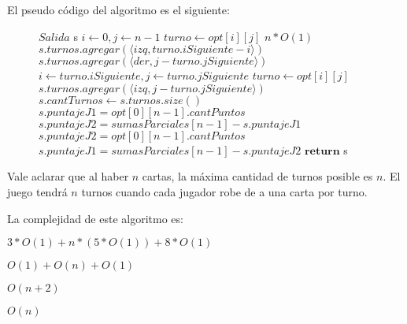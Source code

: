 El pseudo código del algoritmo es el siguiente:

\begin{center}
 \begin{figure}[H]
  \begin{pseudo}
    \State $Salida$  s 
    \State $i \leftarrow 0, j \leftarrow n-1$ 
    \State $turno \leftarrow opt[i][j]$ 
     \hfill $n*O(1)$
       
	\State $s.turnos.agregar(\langle izq, turno.iSiguiente - i \rangle)$ 
      \Else 
	\State $s.turnos.agregar(\langle der, j - turno.jSiguiente \rangle)$ 
      \EndIf
      \State $i \leftarrow turno.iSiguiente, j \leftarrow turno.jSiguiente$ 
      \State $turno \leftarrow opt[i][j]$ 
    \EndWhile
    \State $s.turnos.agregar(\langle izq, j - turno.jSiguiente \rangle)$ 
    \State $s.cantTurnos \leftarrow s.turnos.size()$ 
     
      \State $s.puntajeJ1 = opt[0][n-1].cantPuntos$ 
      \State $s.puntajeJ2 = sumasParciales[n-1] - s.puntajeJ1$ 
    \Else
      \State $s.puntajeJ2 = opt[0][n-1].cantPuntos$ 
      \State $s.puntajeJ1 = sumasParciales[n-1] - s.puntajeJ2$ 
    \EndIf
    \State $\textbf{return}$ s 
   \EndProcedure
  \end{pseudo}

 \end{figure}

\end{center}

Vale aclarar que al haber $n$ cartas, la máxima cantidad de turnos posible es $n$. El juego tendrá $n$ turnos cuando cada jugador robe de a una carta por turno.

La complejidad de este algoritmo es:

$3*O(1) + n*(5*O(1)) + 8*O(1)$

$O(1) + O(n) + O(1)$

$O(n+2)$

$O(n)$
